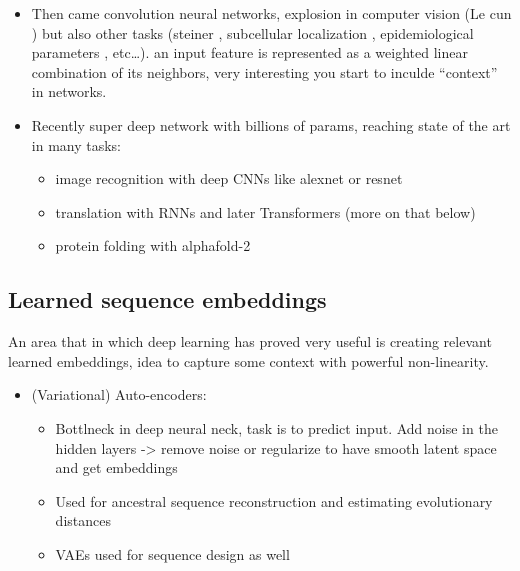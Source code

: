 \documentclass[
  11pt,
  twoside,
  BCOR=10mm,
  listof=totoc]{scrbook}
\providecommand{\tightlist}{%
  \setlength{\itemsep}{0pt}\setlength{\parskip}{0pt}}
\begin{document}
\begin{itemize}
\item
  Then came convolution neural networks, explosion in computer vision (Le cun \autocite{lecunBackpropagationAppliedHandwritten1989,lecunGradientbasedLearningApplied1998}) but also other tasks (steiner \autocite{steinerDrugResistancePrediction2020a}, subcellular localization \autocite{weiPredictionHumanProtein2018}, epidemiological parameters \autocite{voznicaDeepLearningPhylogenies2022}, etc\ldots). an input feature is represented as a weighted linear combination of its neighbors, very interesting you start to inculde ``context'' in networks.
\item
  Recently super deep network with billions of params, reaching state of the art in many tasks:

  \begin{itemize}
  \item
    image recognition with deep CNNs like alexnet \autocite{krizhevskyImageNetClassificationDeep2017} or resnet \autocite{heDeepResidualLearning2016}
  \item
    translation with RNNs \autocite{bahdanauNeuralMachineTranslation2016} and later Transformers \autocite{vaswaniAttentionAllYou2017} (more on that below)
  \item
    protein folding with alphafold-2 \autocite{jumperHighlyAccurateProtein2021}
  \end{itemize}
\end{itemize}

\hypertarget{learned-sequence-embeddings}{%
\subsection{Learned sequence embeddings}\label{learned-sequence-embeddings}}

An area that in which deep learning has proved very useful is creating relevant learned embeddings, idea to capture some context with powerful non-linearity.

\begin{itemize}
\item
  (Variational) Auto-encoders:

  \begin{itemize}
  \tightlist
  \item
    Bottlneck in deep neural neck, task is to predict input. Add noise in the hidden layers -\textgreater{} remove noise or regularize to have smooth latent space and get embeddings
  \item
    Used for ancestral sequence reconstruction \autocite{moretaAncestralProteinSequence2022} and estimating evolutionary distances \autocite{corsoNeuralDistanceEmbeddings2021}
  \item
    VAEs used for sequence design as well \autocite{wuProteinSequenceDesign2021,stantonAcceleratingBayesianOptimization2022}
  \end{itemize}
\end{itemize}
\end{document}
